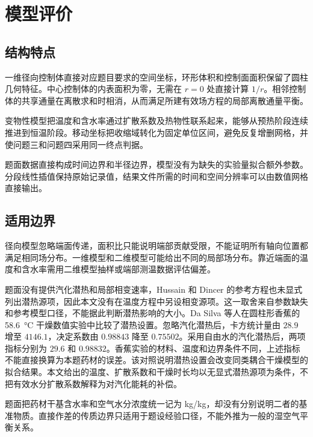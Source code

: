 \documentclass[withoutpreface,bwprint]{cumcmthesis}
\begin{document}
\section{模型评价}

\subsection{结构特点}

一维径向控制体直接对应题目要求的空间坐标，环形体积和控制面面积保留了圆柱几何特征。中心控制体的内表面积为零，无需在 \(r=0\) 处直接计算 \(1/r\)。相邻控制体的共享通量在离散求和时相消，从而满足所建有效场方程的局部离散通量平衡。

变物性模型把温度和含水率通过扩散系数及热物性联系起来，能够从预热阶段连续推进到恒温阶段。移动坐标把收缩域转化为固定单位区间，避免反复增删网格，并使问题三和问题四采用同一终点判据。

题面数据直接构成时间边界和半径边界，模型没有为缺失的实验量拟合额外参数。分段线性插值保持原始记录值，结果文件所需的时间和空间分辨率可以由数值网格直接输出。

\subsection{适用边界}

径向模型忽略端面传递，面积比只能说明端部贡献受限，不能证明所有轴向位置都满足相同场分布。一维模型和二维模型可能给出不同的局部场分布\cite{adrover2019dimensional}。靠近端面的温度和含水率需用二维模型抽样或端部测温数据评估偏差。

题面没有提供汽化潜热和局部相变速率，Hussain 和 Dincer 的参考方程也未显式列出潜热源项，因此本文没有在温度方程中另设相变源项\cite{hussain2003}。这一取舍来自参数缺失和参考模型口径，不能据此判断潜热影响的大小。Da Silva 等人在圆柱形香蕉的 \SI{58.6}{\degreeCelsius} 干燥数值实验中比较了潜热设置。忽略汽化潜热后，卡方统计量由 \(28.9\) 增至 \(4146.1\)，决定系数由 \(0.98843\) 降至 \(0.75502\)。采用自由水的汽化潜热后，两项指标分别为 \(29.6\) 和 \(0.98832\)\cite{silva2014}。香蕉实验的材料、温度和边界条件不同，上述指标不能直接换算为本题药材的误差。该对照说明潜热设置会改变同类耦合干燥模型的拟合结果。本文给出的温度、扩散系数和干燥时长均以无显式潜热源项为条件，不把有效水分扩散系数解释为对汽化能耗的补偿。

题面把药材干基含水率和空气水分浓度统一记为 \si{kg/kg}，却没有分别说明二者的基准物质。直接作差的传质边界只适用于题设经验口径，不能外推为一般的湿空气平衡关系。
\end{document}
